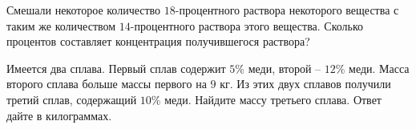 \begin{listofex}
	\item Смешали некоторое количество \( 18 \)-процентного раствора некоторого вещества с таким же количеством \( 14 \)-процентного раствора этого вещества. Сколько процентов составляет концентрация получившегося раствора?
	\item Имеется два сплава. Первый сплав содержит \( 5\% \) меди, второй – \( 12\% \) меди. Масса второго сплава больше массы первого на \( 9 \) кг. Из этих двух сплавов получили третий сплав, содержащий \( 10\% \) меди. Найдите массу третьего сплава. Ответ дайте в килограммах.
\end{listofex}
%
%
